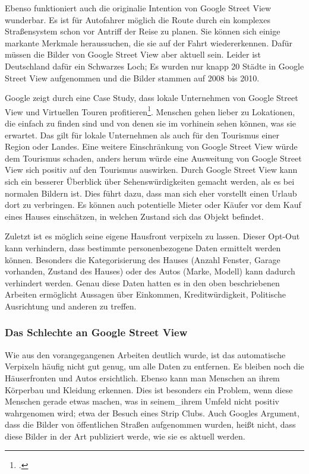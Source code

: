 Ebenso funktioniert auch die originalie Intention von Google Street View
wunderbar. Es ist für Autofahrer möglich die Route durch ein komplexes
Straßensystem schon vor Antriff der Reise zu planen. Sie können sich einige
markante Merkmale heraussuchen, die sie auf der Fahrt wiedererkennen. Dafür
müssen die Bilder von Google Street View aber aktuell sein. Leider ist
Deutschland dafür ein Schwarzes Loch; Es wurden nur knapp 20 Städte in Google
Street View aufgenommen und die Bilder stammen auf 2008 bis 2010.

Google zeigt durch eine Case Study, dass lokale Unternehmen von Google Street
View und Virtuellen Touren
profitieren\footcite{website:google:impact-for-loca-businesses}. Menschen gehen
lieber zu Lokationen, die einfach zu finden sind und von denen sie im vorhinein
sehen können, was sie erwartet. Das gilt für lokale Unternehmen als auch für den
Tourismus einer Region oder Landes. Eine weitere Einschränkung von Google Street
View würde dem Tourismus schaden, anders herum würde eine Ausweitung von Google
Street View sich positiv auf den Tourismus auswirken. Durch Google Street View
kann sich ein besserer Überblick über Sehenswürdigkeiten gemacht werden, als es
bei normalen Bildern ist. Dies führt dazu, dass man sich eher vorstellt einen
Urlaub dort zu verbringen. Es können auch potentielle Mieter oder Käufer vor dem
Kauf eines Hauses einschätzen, in welchen Zustand sich das Objekt befindet.


Zuletzt ist es möglich seine eigene Hausfront verpixeln zu lassen. Dieser
Opt-Out kann verhindern, dass bestimmte personenbezogene Daten ermittelt werden
können. Besonders die Kategorisierung des Hauses (Anzahl Fenster, Garage
vorhanden, Zustand des Hauses) oder des Autos (Marke, Modell) kann dadurch
verhindert werden. Genau diese Daten hatten es in den oben beschriebenen
Arbeiten ermöglicht Aussagen über Einkommen, Kreditwürdigkeit, Politische
Ausrichtung und anderen zu treffen.

\subsubsection{Das Schlechte an Google Street View}

Wie aus den vorangegangenen Arbeiten deutlich wurde, ist das automatische
Verpixeln häufig nicht gut genug, um alle Daten zu entfernen. Es bleiben noch
die Häuserfronten und Autos ersichtlich. Ebenso kann man Menschen an ihrem
Körperbau und Kleidung erkennen. Dies ist besonders ein Problem, wenn diese
Menschen gerade etwas machen, was in seinem\_ihrem Umfeld nicht positiv
wahrgenomen wird; etwa der Besuch eines Strip Clubs. Auch Googles Argument, dass
die Bilder von öffentlichen Straßen aufgenommen wurden, heißt nicht, dass diese
Bilder in der Art publiziert werde, wie sie es aktuell werden.

